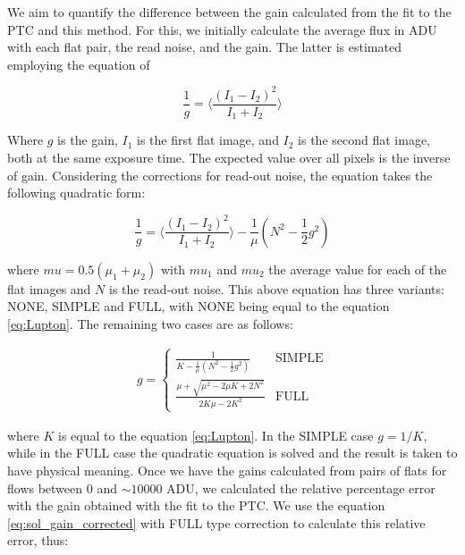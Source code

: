 \vspace{3mm}

We aim to quantify the difference between the gain calculated from the fit to the PTC and this method. For this, we initially calculate the average flux in ADU with each flat pair, the read noise, and the gain. The latter is estimated employing the equation of \cite{lupton2014consequences}

\begin{equation}
    \frac{1}{g} = \Big \langle \frac{(I_1 - I_2)^2}{I_1 + I_2} \Big \rangle 
    \label{eq:Lupton}
\end{equation}

Where $g$ is the gain, $I_1$ is the first flat image, and $I_2$ is the second flat image, both at the same exposure time. The expected value over all pixels is the inverse of gain. Considering the corrections for read-out noise, the equation takes the following quadratic form:

\begin{equation}
    \frac{1}{g} = \Big \langle \frac{(I_1 - I_2)^2}{I_1 + I_2} \Big \rangle - \frac{1}{\mu} (N^2-\frac{1}{2} g^2)
    \label{eq:gain_corrected}
\end{equation}

where $mu = 0.5(\mu_1 + \mu_2)$ with $mu_1$ and $mu_2$ the average value for each of the flat images and $N$ is the read-out noise. This above equation has three variants: NONE, SIMPLE and FULL, with NONE being equal to the equation \ref{eq:Lupton}. The remaining two cases are as follows:

\begin{align}
g = \begin{cases}
  \frac{1}{K - \frac{1}{\mu}(N^2 - \frac{1}{2} g^2)} & \mbox{SIMPLE} \\
  \frac{\mu + \sqrt{\mu^2 - 2 \mu K + 2 N^2}}{2 K \mu - 2 K^2} & \mbox{FULL}
\end{cases}
\label{eq:sol_gain_corrected}
\end{align}

where $K$ is equal to the equation \ref{eq:Lupton}. In the SIMPLE case $g = 1/K$, while in the FULL case the quadratic equation is solved and the result is taken to have physical meaning. Once we have the gains calculated from pairs of flats for flows between 0 and $\sim 10000$ ADU, we calculated the relative percentage error with the gain obtained with the fit to the PTC. We use the equation \ref{eq:sol_gain_corrected} with FULL type correction to calculate this relative error, thus:

